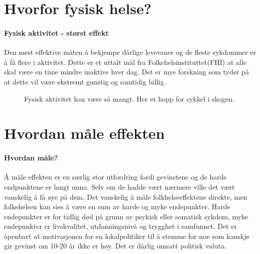\documentclass[12pt]{memoir} %
\begin{document}
	\section{Hvorfor fysisk helse?}
		\paragraph{Fysisk aktivitet - størst effekt\\}
			Den mest effektive måten å bekjempe dårlige levevaner og de fleste sykdommer er å få flere i aktivitet\cite{aktivhb}. Dette er et uttalt mål fra Folkehelsinstituttet(FHI)\cite{htnorge} at alle skal være en time mindre inaktive hver dag. Det er mye forskning som tyder på at dette vil være ekstremt gunstig og samtidig billig\cite{aktivhb}.
					\begin{figure}[h]
                      \centering
                    	  \captionsetup{singlelinecheck=off}
                      	\caption{Fysisk aktivitet kan være så mangt. Her et hopp for sykkel i skogen.}
                      	\label{bikeukfig}
                    \end{figure}  

	\section{Hvordan måle effekten}
		\paragraph{Hvordan måle?\\}
			Å måle effekten er en særlig stor utfordring fordi gevinstene og de harde endpunktene er langt unna. Selv om de hadde vært nærmere ville det vært vanskelig å få øye på dem. Det vanskelig å måle folkhelseeffektene direkte, men folkehelsen kan sies å være en sum av harde og myke endepunkter. Harde endepunkter er for tidlig død på grunn av psykisk eller somatisk sykdom, myke endepunkter er livskvalitet, utdanningsnivå og trygghet i samfunnet. Det er åpenbart at motivasjonen for en lokalpolitiker til å stemme for noe som kanskje gir gevinst om 10-20 år ikke er høy. Det er dårlig omsatt politisk valuta. 
\end{document}
